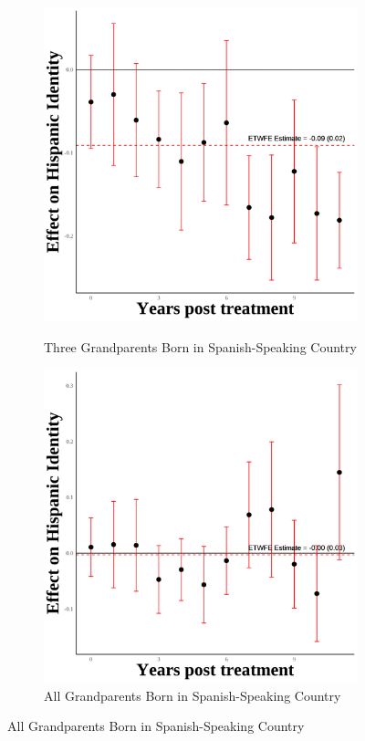 \documentclass[12pt,english]{article}
\begin{document}
\begin{figure}[H]
  \begin{subfigure}[b]{0.30\textwidth}
    \centering
    \caption{Three Grandparents Born in Spanish-Speaking Country}
    \includegraphics[width=\linewidth]{figures/thirdgen-three-hispanic_event_study.png}
    \label{fig:third-gen-three}
  \end{subfigure}
  \hfill %
  \begin{subfigure}[b]{0.30\textwidth}
    \centering
    \caption{All Grandparents Born in Spanish-Speaking Country}
    \includegraphics[width=\linewidth]{figures/thirdgen-four-hispanic_event_study.png}

\end{subfigure}
\end{figure}
\end{document}
